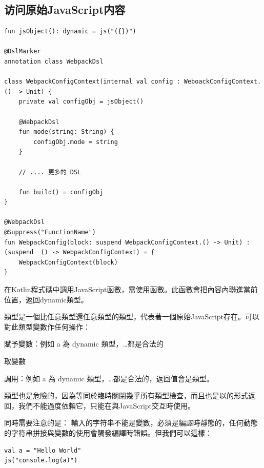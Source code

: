 \subsection*{访问原始JavaScript内容}

\begin{lstlisting}
fun jsObject(): dynamic = js("({})")

@DslMarker
annotation class WebpackDsl

class WebpackConfigContext(internal val config : WeboackConfigContext.() -> Unit) {
    private val configObj = jsObject()

    @WebpackDsl
    fun mode(string: String) {
        configObj.mode = string
    }

    // .... 更多的 DSL

    fun build() = configObj
}

@WebpackDsl
@Suppress("FunctionName")
fun WebpackConfig(block: suspend WebpackConfigContext.() -> Unit) : (suspend  () -> WebpackConfigContext) = {
    WebpackConfigContext(block)
}
\end{lstlisting}

在Kotlin程式碼中調用JavaScript函數，需使用函數。此函數會把內容內聯進當前位置，返回dynamic類型。

類型是一個比任意類型還任意類型的類型，代表著一個原始JavaScript存在。可以對此類型變數作任何操作：

\begin{compactitem}
    \item 賦予變數：例如 a 為 dynamic 類型，\ldots{}都是合法的
    \item 取變數
    \item 調用：例如 a 為 dynamic 類型，\ldots{}都是合法的，返回值會是類型。
\end{compactitem}

類型也是危險的，因為等同於臨時關閉幾乎所有類型檢查，而且也是以的形式返回，我們不能過度依賴它，只能在與JavaScript交互時使用。

同時需要注意的是： 輸入的字符串不能是變數，必須是編譯時靜態的，任何動態的字符串拼接與變數的使用會觸發編譯時錯誤。但我們可以這樣：

\begin{lstlisting}
val a = "Hello World"
js("console.log(a)")
\end{lstlisting}

